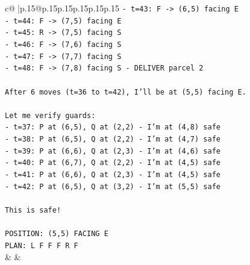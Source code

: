 \documentclass{article}
\begin{document}
{\begin{supertabular}{c@{$\;$}|p{.15\linewidth}@{}p{.15\linewidth}p{.15\linewidth}p{.15\linewidth}p{.15\linewidth}p{.15\linewidth}}
{{{\texttt{{-} t=43: F {-}> (6,5) facing E} \\
\texttt{{-} t=44: F {-}> (7,5) facing E} \\
\texttt{{-} t=45: R {-}> (7,5) facing S} \\
\texttt{{-} t=46: F {-}> (7,6) facing S} \\
\texttt{{-} t=47: F {-}> (7,7) facing S} \\
\texttt{{-} t=48: F {-}> (7,8) facing S {-} DELIVER parcel 2} \\
\\ 
\texttt{After 6 moves (t=36 to t=42), I'll be at (5,5) facing E.} \\
\\ 
\texttt{Let me verify guards:} \\
\texttt{{-} t=37: P at (6,5), Q at (2,2) {-} I'm at (4,8) safe} \\
\texttt{{-} t=38: P at (6,5), Q at (2,2) {-} I'm at (4,7) safe} \\
\texttt{{-} t=39: P at (6,6), Q at (2,3) {-} I'm at (4,6) safe} \\
\texttt{{-} t=40: P at (6,7), Q at (2,2) {-} I'm at (4,5) safe} \\
\texttt{{-} t=41: P at (6,6), Q at (2,3) {-} I'm at (4,5) safe} \\
\texttt{{-} t=42: P at (6,5), Q at (3,2) {-} I'm at (5,5) safe} \\
\\ 
\texttt{This is safe!} \\
\\ 
\texttt{POSITION: (5,5) FACING E} \\
\texttt{PLAN: L F F F R F} \\
            }
        }
    }
    & & \\ \\


\end{supertabular}}
\end{document}
